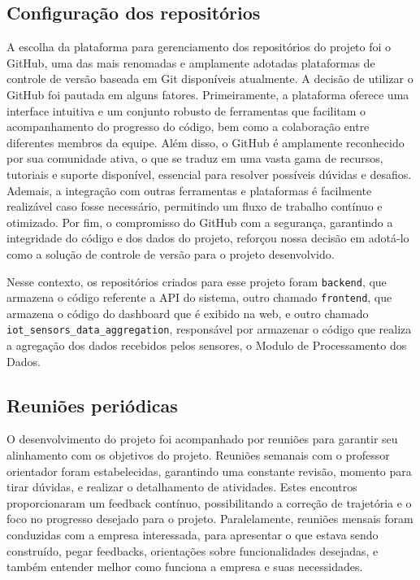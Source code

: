 \subsection{Configuração dos repositórios}
A escolha da plataforma para gerenciamento dos repositórios do projeto foi o GitHub, uma das mais renomadas e amplamente adotadas plataformas de controle de versão baseada em Git disponíveis atualmente. A decisão de utilizar o GitHub foi pautada em alguns fatores. Primeiramente, a plataforma oferece uma interface intuitiva e um conjunto robusto de ferramentas que facilitam o acompanhamento do progresso do código, bem como a colaboração entre diferentes membros da equipe. Além disso, o GitHub é amplamente reconhecido por sua comunidade ativa, o que se traduz em uma vasta gama de recursos, tutoriais e suporte disponível, essencial para resolver possíveis dúvidas e desafios. Ademais, a integração com outras ferramentas e plataformas é facilmente realizável caso fosse necessário, permitindo um fluxo de trabalho contínuo e otimizado. Por fim, o compromisso do GitHub com a segurança, garantindo a integridade do código e dos dados do projeto, reforçou nossa decisão em adotá-lo como a solução de controle de versão para o projeto desenvolvido. 

Nesse contexto, os repositórios criados para esse projeto foram \texttt{backend}, que armazena o código referente a API do sistema, outro chamado \texttt{frontend}, que armazena o código do dashboard que é exibido na web, e outro chamado \texttt{iot\_sensors\_data\_aggregation}, responsável por armazenar o código que realiza a agregação dos dados recebidos pelos sensores, o Modulo de Processamento dos Dados.


\subsection{Reuniões periódicas}
O desenvolvimento do projeto foi acompanhado por reuniões para garantir seu alinhamento com os objetivos do projeto. Reuniões semanais com o professor orientador foram estabelecidas, garantindo uma constante revisão, momento para tirar dúvidas, e realizar o detalhamento de atividades. Estes encontros proporcionaram um feedback contínuo, possibilitando a correção de trajetória e o foco no progresso desejado para o projeto. Paralelamente, reuniões mensais foram conduzidas com a empresa interessada, para apresentar o que estava sendo construído, pegar feedbacks, orientações sobre funcionalidades desejadas, e também entender melhor como funciona a empresa e suas necessidades.

